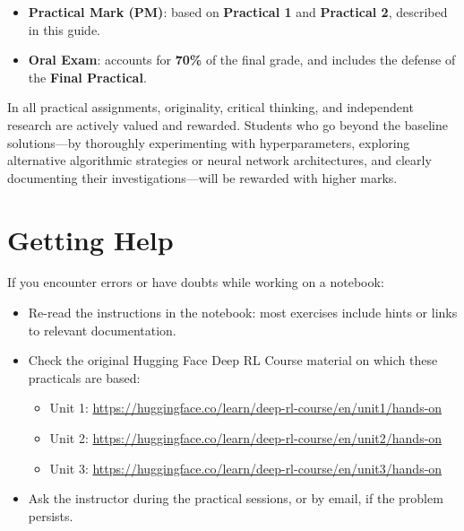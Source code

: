 \documentclass[11pt,a4paper]{article}
\begin{document}
\begin{itemize}
    \item \textbf{Practical Mark (PM)}: based on \textbf{Practical 1} and \textbf{Practical 2}, described in this guide.
    \item \textbf{Oral Exam}: accounts for \textbf{70\%} of the final grade, and includes the defense of the \textbf{Final Practical}.
\end{itemize}

\begin{infobox}
In all practical assignments, originality, critical thinking, and independent research are actively valued and rewarded. Students who go beyond the baseline solutions—by thoroughly experimenting with hyperparameters, exploring alternative algorithmic strategies or neural network architectures, and clearly documenting their investigations—will be rewarded with higher marks.
\end{infobox}

\section{Getting Help}

If you encounter errors or have doubts while working on a notebook:

\begin{itemize}
    \item Re-read the instructions in the notebook: most exercises include hints or links to relevant documentation.
    \item Check the original Hugging Face Deep RL Course material on which these practicals are based:
    \begin{itemize}
        \item Unit 1: \url{https://huggingface.co/learn/deep-rl-course/en/unit1/hands-on}
        \item Unit 2: \url{https://huggingface.co/learn/deep-rl-course/en/unit2/hands-on}
        \item Unit 3: \url{https://huggingface.co/learn/deep-rl-course/en/unit3/hands-on}
    \end{itemize}
    \item Ask the instructor during the practical sessions, or by email, if the problem persists.
\end{itemize}
\end{document}
